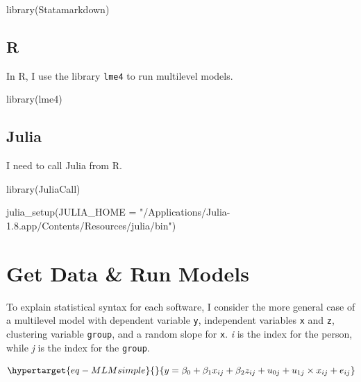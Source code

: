 \documentclass[
  letterpaper,
  DIV=11,
  numbers=noendperiod]{scrreprt}
\newenvironment{Shaded}{\begin{snugshade}}{\end{snugshade}}
\newcommand{\AttributeTok}[1]{\textcolor[rgb]{0.40,0.45,0.13}{#1}}
\newcommand{\FunctionTok}[1]{\textcolor[rgb]{0.28,0.35,0.67}{#1}}
\newcommand{\NormalTok}[1]{\textcolor[rgb]{0.00,0.23,0.31}{#1}}
\newcommand{\StringTok}[1]{\textcolor[rgb]{0.13,0.47,0.30}{#1}}
\begin{document}
\begin{Shaded}
\begin{Highlighting}[]
\FunctionTok{library}\NormalTok{(Statamarkdown)}
\end{Highlighting}
\end{Shaded}

\subsection{R}

In R, I use the library \texttt{lme4} to run multilevel models.

\begin{Shaded}
\begin{Highlighting}[]
\FunctionTok{library}\NormalTok{(lme4) }
\end{Highlighting}
\end{Shaded}

\subsection{Julia}

I need to call Julia from R.

\begin{Shaded}
\begin{Highlighting}[]
\FunctionTok{library}\NormalTok{(JuliaCall)}

\FunctionTok{julia\_setup}\NormalTok{(}\AttributeTok{JULIA\_HOME =} \StringTok{"/Applications/Julia{-}1.8.app/Contents/Resources/julia/bin"}\NormalTok{)}
\end{Highlighting}
\end{Shaded}

\hypertarget{get-data-run-models}{%
\section{Get Data \& Run Models}\label{get-data-run-models}}

To explain statistical syntax for each software, I consider the more
general case of a multilevel model with dependent variable \texttt{y},
independent variables \texttt{x} and \texttt{z}, clustering variable
\texttt{group}, and a random slope for \texttt{x}. \emph{i} is the index
for the person, while \emph{j} is the index for the \texttt{group}.

\begin{equation}\protect\hypertarget{eq-MLMsimple}{}{y = \beta_0 + \beta_1 x_{ij} + \beta_2 z_{ij} + u_{0j} + u_{1j} \times x_{ij} + e_{ij}}\label{eq-MLMsimple}\end{equation}
\end{document}
